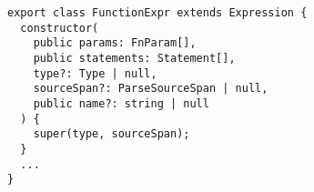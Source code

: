 \begin{verbatim}
export class FunctionExpr extends Expression {
  constructor(
    public params: FnParam[],
    public statements: Statement[],
    type?: Type | null,
    sourceSpan?: ParseSourceSpan | null,
    public name?: string | null
  ) {
    super(type, sourceSpan);
  }
  ...
}
\end{verbatim}
